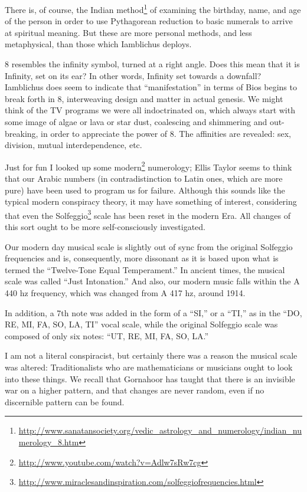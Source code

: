 There is, of course, the Indian method\footnote{\url{http://www.sanatansociety.org/vedic_astrology_and_numerology/indian_numerology_8.htm}} of examining the birthday, name, and age of the person in order to use Pythagorean reduction to basic numerals to arrive at spiritual meaning. But these are more personal methods, and less metaphysical, than those which Iamblichus deploys.

8 resembles the infinity symbol, turned at a right angle. Does this mean that it is Infinity, set on its ear? In other words, Infinity set towards a downfall? Iamblichus does seem to indicate that ``manifestation'' in terms of Bios begins to break forth in 8, interweaving design and matter in actual genesis. We might think of the TV programs we were all indoctrinated on, which always start with some image of algae or lava or star dust, coalescing and shimmering and out-breaking, in order to appreciate the power of 8. The affinities are revealed: sex, division, mutual interdependence, etc.

Just for fun I looked up some modern\footnote{\url{http://www.youtube.com/watch?v=Adlw7sRw7cg}} numerology; Ellis Taylor seems to think that our Arabic numbers (in contradistinction to Latin ones, which are more pure) have been used to program us for failure. Although this sounds like the typical modern conspiracy theory, it may have something of interest, considering that even the Solfeggio\footnote{\url{http://www.miraclesandinspiration.com/solfeggiofrequencies.html}} scale has been reset in the modern Era. All changes of this sort ought to be more self-consciously investigated.

\begin{quotex}
Our modern day musical scale is slightly out of sync from the original Solfeggio frequencies and is, consequently, more dissonant as it is based upon what is termed the ``Twelve-Tone Equal Temperament.'' In ancient times, the musical scale was called ``Just Intonation.'' And also, our modern music falls within the A 440 hz frequency, which was changed from A 417 hz, around 1914.

In addition, a 7th note was added in the form of a ``SI,'' or a ``TI,'' as in the ``DO, RE, MI, FA, SO, LA, TI'' vocal scale, while the original Solfeggio scale was composed of only six notes: ``UT, RE, MI, FA, SO, LA.''
\end{quotex}


I am not a literal conspiracist, but certainly there was a reason the musical scale was altered: Traditionalists who are mathematicians or musicians ought to look into these things. We recall that Gornahoor has taught that there is an invisible war on a higher pattern, and that changes are never random, even if no discernible pattern can be found.



